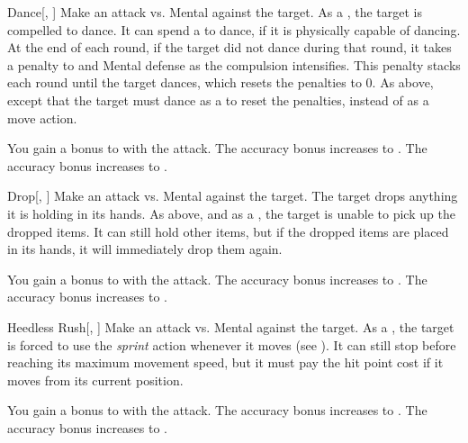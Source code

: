 \lowercase{\hypertarget{spell:Dance}{}}\label{spell:Dance}
\begin{freeability}[Rank 1]{\hypertarget{spell:Dance}{Dance}}[, ]
Make an attack vs. Mental against the target.
\hit As a , the target is compelled to dance.
It can spend a  to dance, if it is physically capable of dancing.
At the end of each round, if the target did not dance during that round, it takes a  penalty to  and Mental defense as the compulsion intensifies.
This penalty stacks each round until the target dances, which resets the penalties to 0.
\crit As above, except that the target must dance as a  to reset the penalties, instead of as a move action.

\rankline
{} You gain a  bonus to  with the attack.
 The accuracy bonus increases to .
 The accuracy bonus increases to .
\end{freeability}
\vspace{0.25em}



\lowercase{\hypertarget{spell:Drop}{}}\label{spell:Drop}
\begin{freeability}[Rank 1]{\hypertarget{spell:Drop}{Drop}}[, ]
Make an attack vs. Mental against the target.
\hit The target drops anything it is holding in its hands.
\crit As above, and as a , the target is unable to pick up the dropped items.
It can still hold other items, but if the dropped items are placed in its hands, it will immediately drop them again.

\rankline
{} You gain a  bonus to  with the attack.
 The accuracy bonus increases to .
 The accuracy bonus increases to .
\end{freeability}
\vspace{0.25em}



\lowercase{\hypertarget{spell:Heedless Rush}{}}\label{spell:Heedless Rush}
\begin{freeability}[Rank 1]{\hypertarget{spell:Heedless Rush}{Heedless Rush}}[, ]
Make an attack vs. Mental against the target.
\hit As a , the target is forced to use the \textit{sprint} action whenever it moves (see ).
It can still stop before reaching its maximum movement speed, but it must pay the hit point cost if it moves from its current position.

\rankline
{} You gain a  bonus to  with the attack.
 The accuracy bonus increases to .
 The accuracy bonus increases to .
\end{freeability}
\vspace{0.25em}



